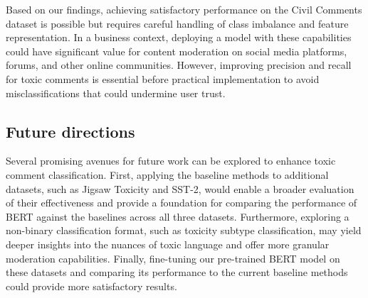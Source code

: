 Based on our findings, achieving satisfactory performance on the Civil Comments dataset is possible but requires careful handling of class imbalance and feature representation. In a business context, deploying a model with these capabilities could have significant value for content moderation on social media platforms, forums, and other online communities. However, improving precision and recall for toxic comments is essential before practical implementation to avoid misclassifications that could undermine user trust.

\subsection{Future directions}

Several promising avenues for future work can be explored to enhance toxic comment classification. First, applying the baseline methods to additional datasets, such as Jigsaw Toxicity and SST-2, would enable a broader evaluation of their effectiveness and provide a foundation for comparing the performance of BERT against the baselines across all three datasets. Furthermore, exploring a non-binary classification format, such as toxicity subtype classification, may yield deeper insights into the nuances of toxic language and offer more granular moderation capabilities. Finally, fine-tuning our pre-trained BERT model on these datasets and comparing its performance to the current baseline methods could provide more satisfactory results.

